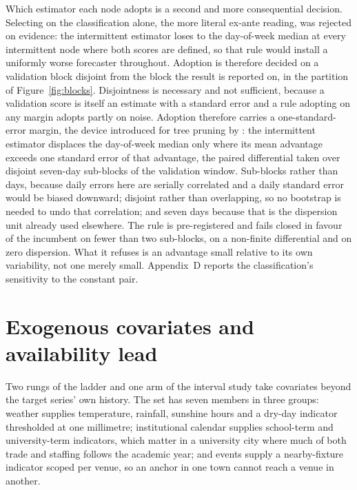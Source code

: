 Which estimator each node adopts is a second and more consequential decision. Selecting on the
classification alone, the more literal ex-ante reading, was rejected on evidence: the intermittent
estimator loses to the day-of-week median at every intermittent node where both scores are
defined, so that rule would install a uniformly worse forecaster throughout. Adoption is therefore
decided on a validation block disjoint from the block the result is reported on, in the partition
of Figure~\ref{fig:blocks}. Disjointness is necessary and not sufficient, because a validation
score is itself an estimate with a standard error and a rule adopting on any margin adopts partly
on noise. Adoption therefore carries a one-standard-error margin, the device introduced for tree
pruning by \citet{breiman_classification_1984}: the intermittent estimator displaces the
day-of-week median only where its mean advantage exceeds one standard error of that advantage,
the paired differential taken over disjoint seven-day sub-blocks of the validation window.
Sub-blocks rather than days, because daily errors here are serially correlated and a daily
standard error would be biased downward; disjoint rather than overlapping, so no bootstrap is
needed to undo that correlation; and seven days because that is the dispersion unit already used
elsewhere. The rule is pre-registered and fails closed in favour of the incumbent on fewer than
two sub-blocks, on a non-finite differential and on zero dispersion. What it refuses is an
advantage small relative to its own variability, not one merely small. Appendix~D reports the
classification's sensitivity to the constant pair.

\section{Exogenous covariates and availability lead}
\label{sec:exo}

Two rungs of the ladder and one arm of the interval study take covariates beyond the target
series' own history. The set has seven members in three groups: weather supplies temperature,
rainfall, sunshine hours and a dry-day indicator thresholded at one millimetre; institutional
calendar supplies school-term and university-term indicators, which matter in a university city
where much of both trade and staffing follows the academic year; and events supply a
nearby-fixture indicator scoped per venue, so an anchor in one town cannot reach a venue in
another.


